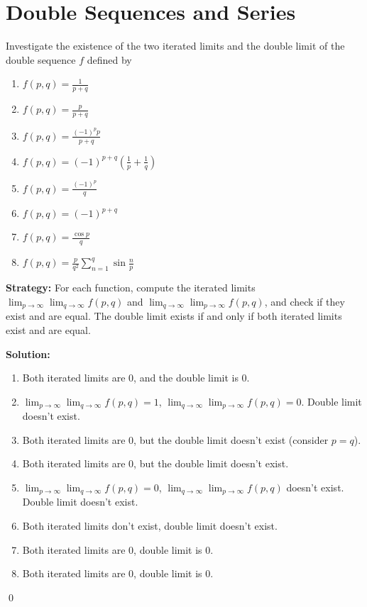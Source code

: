 \section{Double Sequences and Series}



\begin{problembox}
\begin{problemstatement}
Investigate the existence of the two iterated limits and the double limit of the double sequence \(f\) defined by
\begin{enumerate}[label=\alph*)]
\item \( f(p, q) = \frac{1}{p + q}\)
\item \( f(p, q) = \frac{p}{p + q}\)
\item \( f(p, q) = \frac{(-1)^p p}{p + q}\)
\item \( f(p, q) = (-1)^{p+q} \left( \frac{1}{p} + \frac{1}{q} \right)\)
\item \( f(p, q) = \frac{(-1)^p}{q}\)
\item \( f(p, q) = (-1)^{p+q}\)
\item \( f(p, q) = \frac{\cos p}{q}\)
\item \( f(p, q) = \frac{p}{q^2} \sum_{n=1}^{q} \sin \frac{n}{p}\)
\end{enumerate}
\end{problemstatement}
\end{problembox}

\noindent\textbf{Strategy:} For each function, compute the iterated limits \(\lim_{p \to \infty} \lim_{q \to \infty} f(p,q)\) and \(\lim_{q \to \infty} \lim_{p \to \infty} f(p,q)\), and check if they exist and are equal. The double limit exists if and only if both iterated limits exist and are equal.

\bigskip\noindent\textbf{Solution:}
\begin{enumerate}[label=(\alph*)]
\item Both iterated limits are 0, and the double limit is 0.
\item \(\lim_{p \to \infty} \lim_{q \to \infty} f(p,q) = 1\), \(\lim_{q \to \infty} \lim_{p \to \infty} f(p,q) = 0\). Double limit doesn't exist.
\item Both iterated limits are 0, but the double limit doesn't exist (consider \(p = q\)).
\item Both iterated limits are 0, but the double limit doesn't exist.
\item \(\lim_{p \to \infty} \lim_{q \to \infty} f(p,q) = 0\), \(\lim_{q \to \infty} \lim_{p \to \infty} f(p,q)\) doesn't exist. Double limit doesn't exist.
\item Both iterated limits don't exist, double limit doesn't exist.
\item Both iterated limits are 0, double limit is 0.
\item Both iterated limits are 0, double limit is 0.
\end{enumerate}\qed



